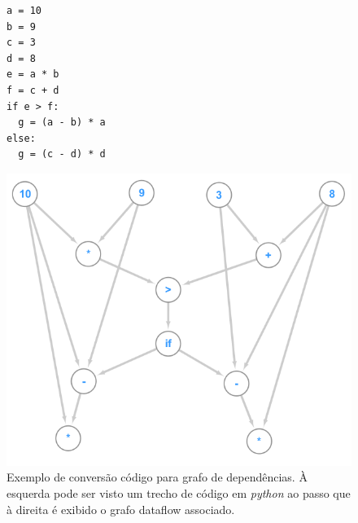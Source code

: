 \begin{figure}
    \centering
    \begin{minipage}{.3\textwidth}
        \centering
\begin{verbatim}
a = 10
b = 9
c = 3
d = 8
e = a * b
f = c + d
if e > f:
  g = (a - b) * a
else:
  g = (c - d) * d
\end{verbatim}
    \end{minipage}
    \begin{minipage}{.675\textwidth}
        \centering %
        \includegraphics[scale=.7]{figuras/dataflow/pythonCodeDf.png}
    \end{minipage}
    \caption{Exemplo de conversão código para grafo de dependências.
    À esquerda pode ser visto um trecho de código em \emph{python} ao passo que à direita é exibido o grafo dataflow associado.}
    \label{fig:dataflowExemploPython}
\end{figure}

% 
